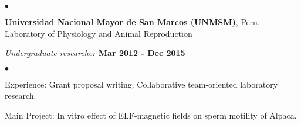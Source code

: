 \documentclass[margin,line]{res}
\newenvironment{list1}{
  \begin{list}{\ding{113}}{%
      \setlength{\itemsep}{0in}
      \setlength{\parsep}{0in} \setlength{\parskip}{0in}
      \setlength{\topsep}{0in} \setlength{\partopsep}{0in}
      \setlength{\leftmargin}{0.17in}}}{\end{list}}
\newenvironment{list2}{
  \begin{list}{$\bullet$}{%
      \setlength{\itemsep}{0in}
      \setlength{\parsep}{0in} \setlength{\parskip}{0in}
      \setlength{\topsep}{0in} \setlength{\partopsep}{0in}
      \setlength{\leftmargin}{0.2in}}}{\end{list}}
\begin{document}
\begin{resume}
\begin{list1}
\begin{list2}
	\end{list2}
\end{list1}

{\bf Universidad Nacional Mayor de San Marcos (UNMSM)}, Peru.\\
Laboratory of Physiology and Animal Reproduction\\
\vspace*{-.1in}
\begin{list1}
	\item[] {\em Undergraduate researcher} \hfill {\bf Mar 2012 - Dec 2015}\\
	\vspace*{-.1in}
	\begin{list2} %
		\item Experience: Grant proposal writing. Collaborative team-oriented laboratory research. %
		\item Main Project: In vitro effect of ELF-magnetic fields on sperm motility of Alpaca.\\ %
	\end{list2}
\end{list1}


\end{resume}
\end{document}

